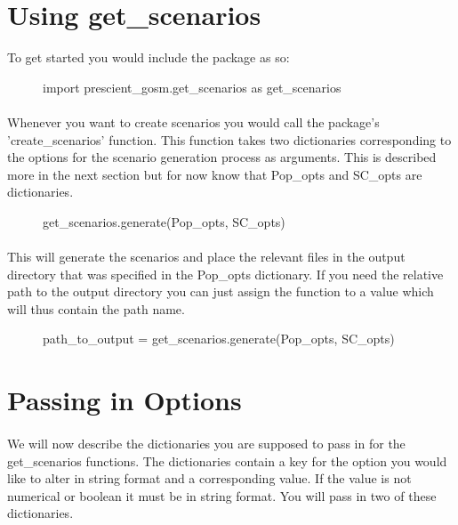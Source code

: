 \documentclass{article}
\begin{document}
\section{Using get\_scenarios}

To get started you would include the package as so:\\

\begin{figure}[H]
	\begin{framed}
		import prescient\_gosm.get\_scenarios as get\_scenarios
	\end{framed}
\end{figure}

\paragraph{}
Whenever you want to create scenarios you would call the package's 'create\_scenarios' function. This function takes two dictionaries corresponding to the options for the scenario generation process as arguments. This is described more in the next section but for now know that Pop\_opts and SC\_opts are dictionaries. 


\begin{figure}[H]
	\begin{framed}
		get\_scenarios.generate(Pop\_opts, SC\_opts)
	\end{framed}
\end{figure}

\paragraph{}
This will generate the scenarios and place the relevant files in the output directory that was specified in the Pop\_opts dictionary. If you need the relative path to the output directory you can just assign the function to a value which will thus contain the path name.


\begin{figure}[H]
	\begin{framed}
		path\_to\_output = get\_scenarios.generate(Pop\_opts, SC\_opts)
	\end{framed}
\end{figure}

\section{Passing in Options}

\paragraph{}
We will now describe the dictionaries you are supposed to pass in for the get\_scenarios functions. The dictionaries contain a key for the option you would like to alter in string format and a corresponding value. If the value is not numerical or boolean it must be in string format. You will pass in two of these dictionaries. 
\end{document}
